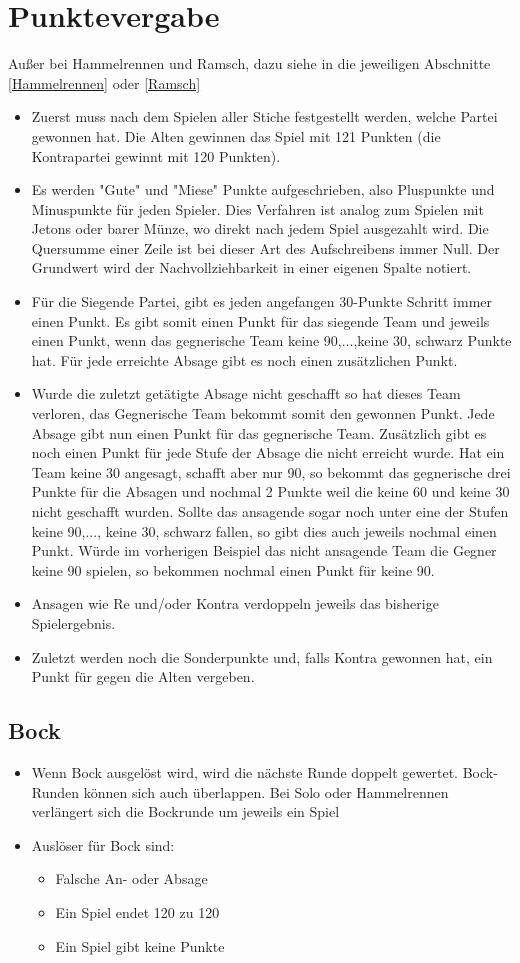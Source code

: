 \documentclass[a4paper,11pt]{article}
\begin{document}
\section{Punktevergabe}
Außer bei Hammelrennen und Ramsch, dazu siehe in die jeweiligen Abschnitte \ref{Hammelrennen} oder \ref{Ramsch}
\begin{itemize}
\item Zuerst muss nach dem Spielen aller Stiche festgestellt werden, welche Partei gewonnen hat. Die Alten gewinnen das Spiel mit 121 Punkten (die Kontrapartei gewinnt mit 120 Punkten).
\item Es werden "Gute" und "Miese" Punkte aufgeschrieben, also Pluspunkte und Minuspunkte für jeden Spieler. Dies Verfahren ist analog zum Spielen mit Jetons oder barer Münze, wo direkt nach jedem Spiel ausgezahlt wird. Die Quersumme einer Zeile ist bei dieser Art des Aufschreibens immer Null. Der Grundwert wird der Nachvollziehbarkeit in einer eigenen Spalte notiert.
\item Für die Siegende Partei, gibt es jeden angefangen 30-Punkte Schritt immer einen Punkt. Es gibt somit einen Punkt für das siegende Team und jeweils einen Punkt, wenn das gegnerische Team keine 90,...,keine 30, schwarz Punkte hat. Für jede erreichte Absage gibt es noch einen zusätzlichen Punkt.
\item Wurde die zuletzt getätigte Absage nicht geschafft so hat dieses Team verloren, das Gegnerische Team bekommt somit den gewonnen Punkt. Jede Absage gibt nun einen Punkt für das gegnerische Team. Zusätzlich gibt es noch einen Punkt für jede Stufe der Absage die nicht erreicht wurde. Hat ein Team keine 30 angesagt, schafft aber nur 90, so bekommt das gegnerische drei Punkte für die Absagen und nochmal 2 Punkte weil die keine 60 und keine 30 nicht geschafft wurden. Sollte das ansagende sogar noch unter eine der Stufen keine 90,..., keine 30, schwarz fallen, so gibt dies auch jeweils nochmal einen Punkt. Würde im vorherigen Beispiel das nicht ansagende Team die Gegner keine 90 spielen, so bekommen nochmal einen Punkt für keine 90.
\item Ansagen wie Re und/oder Kontra verdoppeln jeweils das bisherige Spielergebnis.
\item Zuletzt werden noch die Sonderpunkte und, falls Kontra gewonnen hat, ein Punkt für gegen die Alten vergeben.
\end{itemize}
\subsection{Bock}
\begin{itemize}
\item Wenn Bock ausgelöst wird, wird die nächste Runde doppelt gewertet. Bock-Runden können sich auch überlappen. Bei Solo oder Hammelrennen verlängert sich die Bockrunde um jeweils ein Spiel
\item Auslöser für Bock sind:
\begin{itemize}
\item Falsche An- oder Absage
\item Ein Spiel endet 120 zu 120
\item Ein Spiel gibt keine Punkte
\end{itemize}
\end{itemize}
\end{document}
